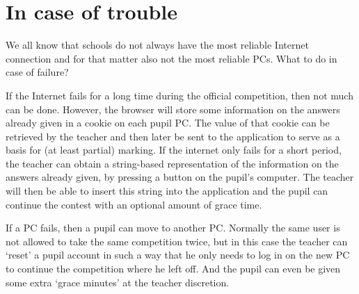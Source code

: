 \section{In case of trouble}

We all know that schools do not always have the most reliable Internet connection and for that matter also not the most reliable PCs. What to do in case of failure?

If the Internet fails for a long time during the official competition, then not much can be done. However, the browser will store some information on the answers already given in a cookie on each pupil PC. The value of that cookie can be retrieved by the teacher and then later be sent to the application to serve as a basis for (at least partial) marking. If the internet only fails for a short period, the teacher can obtain a string-based representation of the information on the answers already given, by pressing a button on the pupil's computer. The teacher will then be able to insert this string into the application and the pupil can continue the contest with an optional amount of grace time. 

If a PC fails, then a pupil can move to another PC. Normally the same user is not allowed to take the same competition twice, but in this case the teacher can `reset' a pupil account in such a way that he only needs to log in on the new PC to continue the competition where he left off. And the pupil can even be given some extra `grace minutes' at the teacher discretion. 